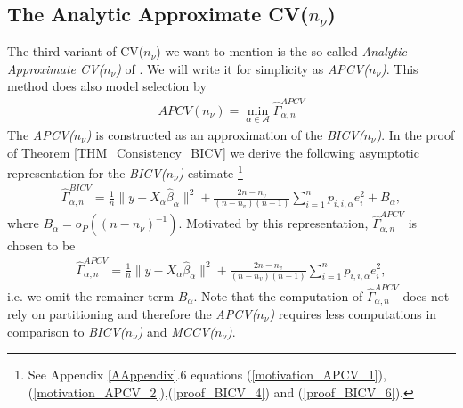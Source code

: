 \documentclass[Research_Module_ES.tex]{subfiles}
\begin{document}
\subsection{The Analytic Approximate CV($n_\nu$)}
The third variant of CV($n_\nu$) we want to mention is the so called \textit{Analytic Approximate CV($n_\nu$)} of \cite{shao}. We will write it for simplicity as \textit{APCV($n_\nu$)}. This method does also model selection by 
\begin{align*}
APCV(n_\nu)=\min_{\alpha\in\mathcal{A}}\hat{\Gamma}_{\alpha,n}^{APCV}
\end{align*}
The \textit{APCV($n_\nu$)} is constructed as an approximation of the \textit{BICV($n_\nu$)}. In the proof of Theorem \ref{THM_Consistency_BICV} we derive the following asymptotic representation for the \textit{BICV($n_\nu$)} estimate
\footnote{See Appendix \ref{AAppendix}.6 equations (\ref{motivation_APCV_1}),(\ref{motivation_APCV_2}),(\ref{proof_BICV_4}) and (\ref{proof_BICV_6}).}
\begin{align*}
\hat{\Gamma}_{\alpha,n}^{BICV}=\frac{1}{n}\lVert y-X_\alpha\hat{\beta}_\alpha\rVert^2 + \frac{2n-n_v}{(n-n_v)(n-1)}\sum_{i=1}^np_{i,i,\alpha}e_i^2 + B_\alpha,
\end{align*}
where $B_\alpha = o_P((n-n_\nu)^{-1})$. 
Motivated by this representation, $\hat{\Gamma}_{\alpha,n}^{APCV}$ is chosen to be
\begin{align*}
\hat{\Gamma}_{\alpha,n}^{APCV}=\frac{1}{n}\lVert y-X_\alpha\hat{\beta}_\alpha\rVert^2 + \frac{2n-n_v}{(n-n_v)(n-1)}\sum_{i=1}^np_{i,i,\alpha}e_i^2,
\end{align*}
i.e. we omit the remainer term $B_\alpha$.
Note that the computation of $\hat{\Gamma}_{\alpha,n}^{APCV}$ does not rely on partitioning and therefore the \textit{APCV($n_\nu$)} requires less computations in comparison to \textit{BICV($n_\nu$)} and \textit{MCCV($n_\nu$)}.
\end{document}
